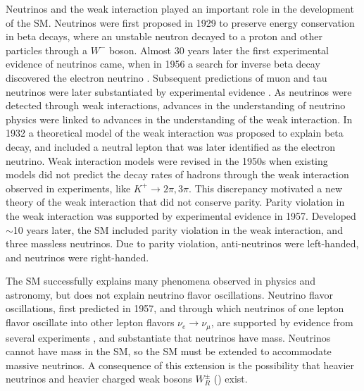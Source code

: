 Neutrinos and the weak interaction played an important role in the development of the SM.  
Neutrinos were first proposed in 1929 to preserve energy conservation in beta decays, where an unstable 
neutron decayed to a proton and other particles through a $W^{-}$ boson.  Almost 30 years later the first 
experimental evidence of neutrinos came, when in 1956 a search for inverse beta decay discovered the electron 
neutrino \cite{firstNuDiscovery}.  Subsequent predictions of muon and tau neutrinos were later substantiated 
by experimental evidence \cite{muNuDiscovery,tauNuDiscovery}.  As neutrinos were detected through weak 
interactions, advances in the understanding of neutrino physics were linked to advances in the 
understanding of the weak interaction.  In 1932 a theoretical model of the weak interaction was proposed to 
explain beta decay, and included a neutral lepton that was later identified as the electron neutrino.  Weak 
interaction models were revised in the 1950s when existing models did not predict the decay rates of hadrons 
through the weak interaction observed in experiments, like $K^{+} \rightarrow 2\pi, 3\pi$.  This discrepancy 
motivated a new theory of the weak interaction that did not conserve parity.  Parity violation in the weak 
interaction was supported by experimental evidence \cite{weakParityViolation} in 1957.  Developed $\sim$10 years 
later, the SM included parity violation in the weak interaction, and three massless neutrinos.  Due to parity 
violation, anti-neutrinos were left-handed, and neutrinos were right-handed.

The SM successfully explains many phenomena observed in physics and astronomy, but does not explain neutrino 
flavor oscillations.  Neutrino flavor oscillations, first predicted in 1957, and through which neutrinos of one 
lepton flavor oscillate into other lepton flavors $\nu_{e} \rightarrow \nu_{\mu}$, are supported by evidence 
from several experiments \cite{kamiokandeTwo,solarNuSummary,NOvAresults,mainzPhaseIIResults,t2kResults}, and 
substantiate that neutrinos have mass.  Neutrinos cannot have mass in the SM, so the SM must be extended to 
accommodate massive neutrinos.  A consequence of this extension is the possibility that heavier neutrinos 
\nul and heavier charged weak bosons $W^{\pm}_{R}$ (\WR) exist.

